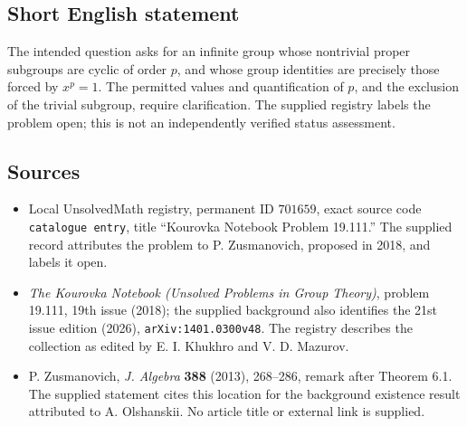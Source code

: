 \documentclass[11pt]{article}
\begin{document}
\subsection{Short English statement}
The intended question asks for an infinite group whose nontrivial proper subgroups are cyclic of order \(p\), and whose group identities are precisely those forced by \(x^p=1\). The permitted values and quantification of \(p\), and the exclusion of the trivial subgroup, require clarification. The supplied registry labels the problem open; this is not an independently verified status assessment.
\subsection{Sources}
\begin{itemize}
\item Local UnsolvedMath registry, permanent ID \(701659\), exact source code \texttt{catalogue entry}, title ``Kourovka Notebook Problem 19.111.'' The supplied record attributes the problem to P. Zusmanovich, proposed in 2018, and labels it open.
\item \emph{The Kourovka Notebook (Unsolved Problems in Group Theory)}, problem 19.111, 19th issue (2018); the supplied background also identifies the 21st issue edition (2026), \texttt{arXiv:1401.0300v48}. The registry describes the collection as edited by E. I. Khukhro and V. D. Mazurov.
\item P. Zusmanovich, \emph{J. Algebra} \textbf{388} (2013), 268--286, remark after Theorem 6.1. The supplied statement cites this location for the background existence result attributed to A. Olshanskii. No article title or external link is supplied.
\end{itemize}
\end{document}
